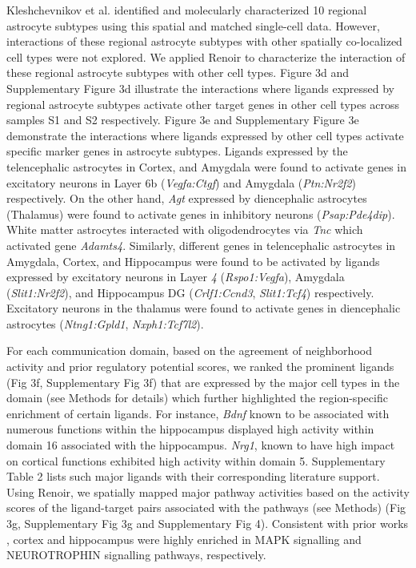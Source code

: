 Kleshchevnikov et al. \citep{Kleshchevnikov2022} identified and molecularly characterized 10 regional astrocyte subtypes using this spatial and matched single-cell data. However, interactions of these regional astrocyte subtypes with other spatially co-localized cell types were not explored. We applied Renoir to characterize the interaction of these regional astrocyte subtypes with other cell types. Figure 3d and Supplementary Figure 3d illustrate the interactions where ligands expressed by regional astrocyte subtypes activate other target genes in other cell types across samples S1 and S2 respectively. Figure 3e and Supplementary Figure 3e demonstrate the interactions where ligands expressed by other cell types activate specific marker genes in astrocyte subtypes. Ligands expressed by the telencephalic astrocytes in Cortex, and Amygdala were found to activate genes in excitatory neurons in Layer 6b (\textit{Vegfa:Ctgf}) and Amygdala (\textit{Ptn:Nr2f2}) respectively. On the other hand, \textit{Agt} expressed by diencephalic astrocytes (Thalamus) were found to activate genes in inhibitory neurons (\textit{Psap:Pde4dip}). White matter astrocytes interacted with oligodendrocytes via \textit{Tnc} which activated gene \textit{Adamts4}. Similarly, different genes in telencephalic astrocytes in Amygdala, Cortex, and Hippocampus were found to be activated by ligands expressed by excitatory neurons in Layer \textit{4} (\textit{Rspo1:Vegfa}), Amygdala (\textit{Slit1:Nr2f2}), and Hippocampus DG (\textit{Crlf1:Ccnd3}, \textit{Slit1:Tcf4}) respectively. Excitatory neurons in the thalamus were found to activate genes in diencephalic astrocytes (\textit{Ntng1:Gpld1}, \textit{Nxph1:Tcf7l2}).

For each communication domain, based on the agreement of neighborhood activity and prior regulatory potential scores, we ranked the prominent ligands (Fig 3f, Supplementary Fig 3f) that are expressed by the major cell types in the domain (see Methods for details) which further highlighted the region-specific enrichment of certain ligands. For instance, \textit{Bdnf} known to be associated with numerous functions within the hippocampus \citep{Heldt2007} displayed high activity within domain 16 associated with the hippocampus. \textit{Nrg1}, known to have high impact on cortical functions \citep{AGARWAL20141130} exhibited high activity within domain 5. Supplementary Table 2 lists such major ligands with their corresponding literature support. Using Renoir, we spatially mapped major pathway activities based on the activity scores of the ligand-target pairs associated with the pathways (see Methods) (Fig 3g, Supplementary Fig 3g and Supplementary Fig 4). Consistent with prior works \citep{https://doi.org/10.1002/cne.21186,10.3389/fnins.2016.00026}, cortex and hippocampus were highly enriched in MAPK signalling and NEUROTROPHIN signalling pathways, respectively. 

